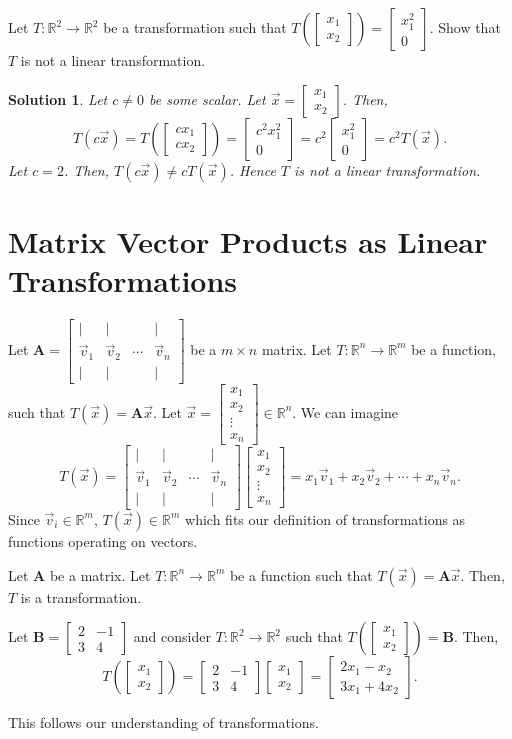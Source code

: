 \documentclass[]{book}
\newcommand{\nextline}{\hspace*{0pt}\newline}
\newcommand{\vecxx}[1][x]{\ensuremath{\begin{bmatrix}
#1_1 \\
#1_2
\end{bmatrix}}}
\newcommand{\vecxxdx}[1][x]{\ensuremath{\begin{bmatrix}
#1_1 \\
#1_2 \\
\vdots \\
#1_n
\end{bmatrix}}}
\newcommand{\vecn}[1]{\ensuremath{\vec{v}_{#1}}}
\newcommand{\mat}[1]{\ensuremath{\mathbf{#1}}}
\newcommand{\cmat}[1][v]{\begin{bmatrix}
        \vert & \vert & & \vert \\
        \vec{#1}_1 & \vec{#1}_2 & \cdots & \vec{#1}_n \\
        \vert & \vert & & \vert
    \end{bmatrix}
}
\newcommand{\R}{\ensuremath{\mathbb{R}}}
\newtheorem*{solution}{Solution}
\begin{document}
\begin{example}
    \nextline
    Let $T:\mathbb{R}^2 \to \mathbb{R}^2$ be a transformation such that $T\left(\vecxx\right) = \begin{bmatrix}x_1^2 \\ 0\end{bmatrix}$. Show that $T$ is not a linear transformation.

\begin{solution}
    Let $c \neq 0$ be some scalar. Let $\vec{x}=\vecxx$. Then,
    \[T\left(c\vec{x}\right) = T\left(\begin{bmatrix}cx_1 \\ cx_2\end{bmatrix}\right) = \begin{bmatrix}c^2x_1^2 \\ 0\end{bmatrix} = c^2\begin{bmatrix}x_1^2 \\ 0\end{bmatrix} = c^2T(\vec{x}).\]
    Let $c=2$. Then, $T(c\vec{x}) \neq cT(\vec{x})$. Hence $T$ is not a linear transformation. \hfill \qedsymbol
\end{solution}
\end{example}

\section{Matrix Vector Products as Linear Transformations}
Let $\mat{A}=\cmat$ be a $m\times n$ matrix. Let $T:\mathbb{R}^n \to \mathbb{R}^m$ be a function, such that $T(\vec{x}) = \mat{A} \vec{x}$. Let $\vec{x} = \vecxxdx \in \mathbb{R}^n$. We can imagine
\[T(\vec{x}) = \cmat \vecxxdx = x_1\vecn{1} + x_2\vecn{2} + \cdots + x_n\vecn{n}.\]
Since $\vecn{i} \in \mathbb{R}^m$, $T(\vec{x}) \in \mathbb{R}^m$ which fits our definition of transformations as functions operating on vectors.
\begin{theorem}
    Let $\mat{A}$ be a matrix. Let $T:\mathbb{R}^n \to \mathbb{R}^m$ be a function such that $T(\vec{x}) = \mat{A} \vec{x}$. Then, $T$ is a transformation.
\end{theorem}
\begin{example}
    Let $\mat{B} = \begin{bmatrix}2 & -1 \\ 3 & 4\end{bmatrix}$ and consider $T: \R^2 \to \R^2$ such that $T\left(\vecxx\right) = \mat{B}$. Then,
    \[T\left(\vecxx\right) = \begin{bmatrix}2 & -1 \\ 3 & 4\end{bmatrix} \vecxx = \begin{bmatrix}2x_1-x_2 \\ 3x_1+4x_2\end{bmatrix}.\]
    
    This follows our understanding of transformations. \hfill \qedsymbol
\end{example}
\end{document}
